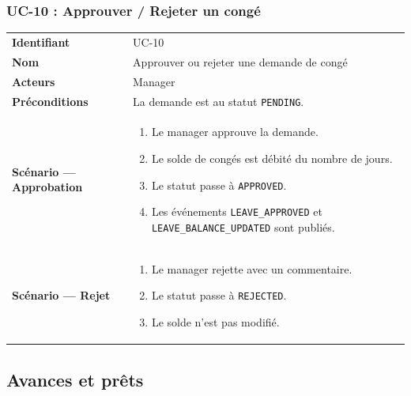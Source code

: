 \documentclass[a4paper,12pt,openany]{book}
\begin{document}
    \subsubsection*{UC-10 : Approuver / Rejeter un congé}
    \begin{table}[H]
        \centering
        \begin{tabularx}{\textwidth}{lX}
    \toprule
    \textbf{Identifiant} & UC-10 \\
    \textbf{Nom}         & Approuver ou rejeter une demande de congé \\
    \textbf{Acteurs}     & Manager \\
    \textbf{Préconditions} & La demande est au statut \texttt{PENDING}. \\
    \midrule
    \textbf{Scénario — Approbation} &
    \begin{enumerate}[nosep]
      \item Le manager approuve la demande.
      \item Le solde de congés est débité du nombre de jours.
      \item Le statut passe à \texttt{APPROVED}.
      \item Les événements \texttt{LEAVE\_APPROVED} et \texttt{LEAVE\_BALANCE\_UPDATED} sont publiés.
    \end{enumerate} \\
    \midrule
    \textbf{Scénario — Rejet} &
    \begin{enumerate}[nosep]
      \item Le manager rejette avec un commentaire.
      \item Le statut passe à \texttt{REJECTED}.
      \item Le solde n'est pas modifié.
    \end{enumerate} \\
    \bottomrule
        \end{tabularx}
    \end{table}


    \subsection{Avances et prêts}
\end{document}
